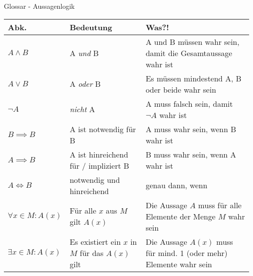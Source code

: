 \begin{frame}[fragile]{Glossar - Aussagenlogik}
    \small
    \begin{tabular}{p{} p{} p{}}
        \toprule
        Abk.                     & Bedeutung                                       & Was?!                                                              \\
        \midrule
        $A\land B$               & A \textit{und} B                                & A und B müssen wahr sein, damit die Gesamtaussage wahr ist         \\
        $A\lor B$                & A \textit{oder} B                               & Es müssen mindestend A, B oder beide wahr sein                     \\
        $\lnot A$                & \textit{nicht} A                                & A muss falsch sein, damit $\lnot A$ wahr ist                       \\
        $B \implies B$           & A ist notwendig für B                           & A muss wahr sein, wenn B wahr ist                                  \\
        $A \implies B$           & A ist hinreichend für / impliziert B            & B muss wahr sein, wenn A wahr ist                                  \\
        $A \iff B$               & notwendig und hinreichend                       & genau dann, wenn                                                   \\
        $\forall x \in M : A(x)$ & Für alle $x$ aus $M$ gilt $A(x)$                & Die Aussage $A$ muss für alle Elemente der Menge $M$ wahr sein     \\
        $\exists x \in M : A(x)$ & Es existiert ein $x$ in $M$ für das $A(x)$ gilt & Die Aussage $A(x)$ muss für mind. 1 (oder mehr) Elemente wahr sein \\
        \bottomrule
    \end{tabular}
\end{frame}